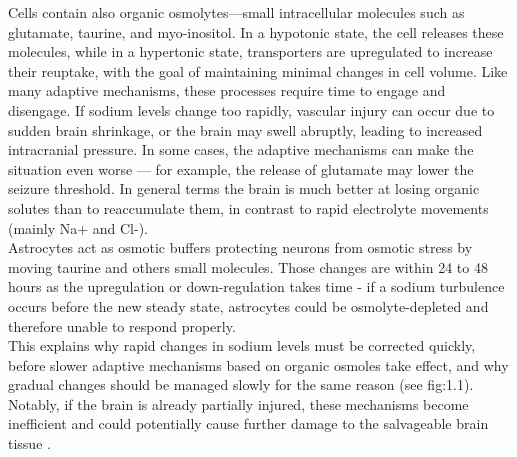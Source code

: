 Cells contain also organic osmolytes—small intracellular molecules such as glutamate, taurine, and myo-inositol. In a hypotonic state, the cell releases these molecules, while in a hypertonic state, transporters are upregulated to increase their reuptake, with the goal of maintaining minimal changes in cell volume. 
\newline Like many adaptive mechanisms, these processes require time to engage and disengage. If sodium levels change too rapidly, vascular injury can occur due to sudden brain shrinkage, or the brain may swell abruptly, leading to increased intracranial pressure. In some cases, the adaptive mechanisms can make the situation even worse — for example, the release of glutamate may lower the seizure threshold. In general terms the brain is much better at losing organic solutes than to reaccumulate them, in contrast to rapid electrolyte movements (mainly Na+ and Cl-).\\

Astrocytes act as osmotic buffers protecting neurons from osmotic stress by moving taurine and others small molecules. Those changes are within 24 to 48 hours  as the upregulation or down-regulation takes time - if a  sodium turbulence occurs before the new steady state, astrocytes could be osmolyte-depleted and therefore unable to respond properly.\\

This explains why rapid changes in sodium levels must be corrected quickly, before slower adaptive mechanisms based on organic osmoles take effect, and why gradual changes should be managed slowly for the same reason (see fig:1.1). Notably, if the brain is already partially injured, these mechanisms become inefficient and could potentially cause further damage to the salvageable brain tissue \cite{babaApproachManagementSodium2022a}.\\


